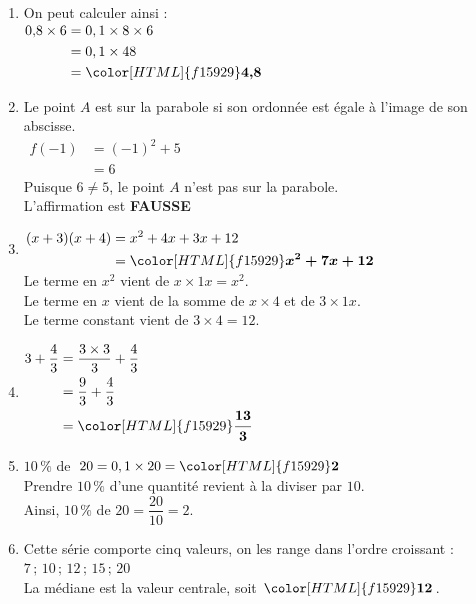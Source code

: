 \documentclass[a4paper,11pt,landscape,exos]{nsi} %
\begin{document}
\begin{multicols}{2}
\maketitle

\begin{enumerate}[]

    \item On peut calculer ainsi : \\
    $\begin{aligned}
    0{,}8\times6&=0,1\times 8\times6\\
    &=0,1\times 48\\
    &={\color[HTML]{f15929}\boldsymbol{4{,}8}}
    \end{aligned}$
\item Le point $A$ est sur la parabole si son ordonnée est égale à l'image de son abscisse. \\
    $\begin{aligned}
        f(-1)&=(-1)^2+5\\
        &=6
        \end{aligned}$
        \\
        Puisque $6 \neq 5$, le point $A$ n'est pas sur la parabole. \\L'affirmation est {\bfseries \color[HTML]{f15929}FAUSSE}
\item $\begin{aligned}
      (x+3)(x+4)&=x^2+4x+3x+12\\
      &={\color[HTML]{f15929}\boldsymbol{x^2+7x+12}}
      \end{aligned}$\\Le terme en $x^2$ vient de $x\times 1x=x^2$.\\Le terme en $x$ vient de la somme de $x \times 4$ et de $3 \times 1x$.\\Le terme constant vient de $3\times 4= 12$.
\item $\begin{aligned}
      3+\dfrac{4}{3} &= \dfrac{3 \times 3}{3} + \dfrac{4}{3} \\
      &= \dfrac{9}{3} + \dfrac{4}{3}\\
      &  ={\color[HTML]{f15929}\boldsymbol{\dfrac{13}{3}}}
      \end{aligned}$
\item $10\,\%$ de $20 = 0,1 \times 20={\color[HTML]{f15929}\boldsymbol{2}}$\\ Prendre $10\,\%$  d'une quantité revient à la diviser par $10$.\\
      Ainsi, $10\,\%$ de $20 = \dfrac{20}{10}=2$.
\item Cette série comporte cinq valeurs, on les range dans l'ordre croissant :\\
      $7\,;\,10\,;\,12\,;\,15\,;\,20$\\
      La médiane est la valeur centrale, soit ${\color[HTML]{f15929}\boldsymbol{12}}$.


\end{enumerate}
\end{multicols}
\end{document}
